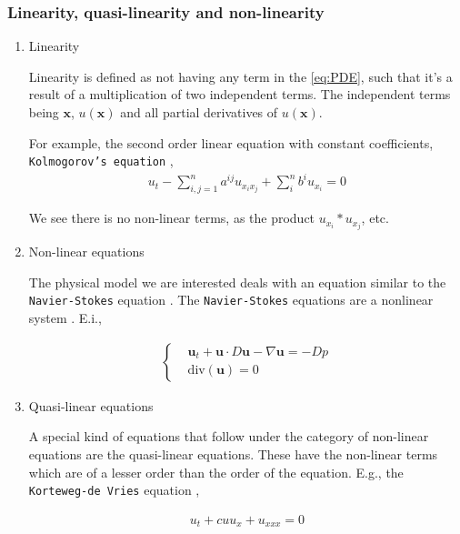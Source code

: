 \documentclass[11pt]{article}
\begin{document}
\subsubsection{Linearity, quasi-linearity and non-linearity}
\label{sec:orgc3f33cb}
\begin{enumerate}
\item Linearity
\label{sec:org6e3423b}

Linearity is defined as not having any term in the \eqref{eq:PDE}, such that it's
a result of a multiplication of two independent terms. The independent terms
being \(\mathbf{x}\), \(u(\mathbf{x})\) and all partial derivatives of
\(u(\mathbf{x})\).

For example, the second order linear equation with constant
coefficients, \texttt{Kolmogorov's equation} \cite{evans1998partial},
\begin{equation}
\begin{aligned}
u_{t} - \sum_{i,j=1}^{n}{a^{ij}u_{x_{i}x_{j}}} + \sum_{i}^{n}{b^{i}u_{x_{i}}} = 0
\end{aligned}
\end{equation}

We see there is no non-linear terms, as the product \(u_{x_{i}}*u_{x_{j}}\), etc.

\item Non-linear equations
\label{sec:org289e430}
\label{sec:non-linear}

The physical model we are interested deals with an equation similar to the
\texttt{Navier-Stokes} equation \cite{kerner1993}. The \texttt{Navier-Stokes} equations are a
nonlinear system \cite{john1978partial} \cite{kerner1993}.
E.i.,

\begin{equation}
\label{eq:NavEstEQ}
\begin{aligned}
\begin{cases}
&\mathbf{u}_t + \mathbf{u} \cdot{} D\mathbf{u} - \nabla \mathbf{u} = - Dp \\
&\text{div}(\mathbf{u}) = 0
\end{cases}
\end{aligned}
\end{equation}

\item Quasi-linear equations
\label{sec:orge65cc53}

A special kind of equations that follow under the category of non-linear
equations are the quasi-linear equations. These have the non-linear terms which
are of a lesser order than the order of the equation. E.g., the \texttt{Korteweg-de
Vries} equation \cite{john1978partial},

\begin{equation}
\begin{aligned}
u_t + c uu_{x} + u_{xxx} = 0
\end{aligned}
\end{equation}
\end{enumerate}
\end{document}
